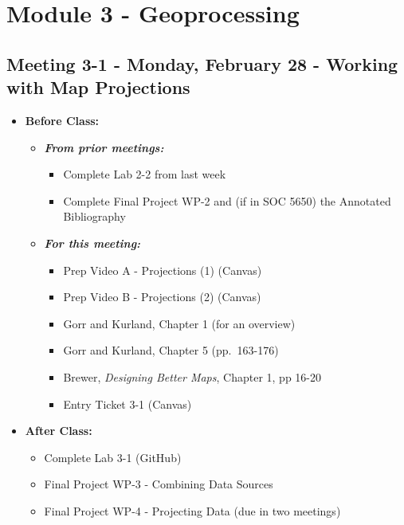 \documentclass[
]{book}
\providecommand{\tightlist}{%
  \setlength{\itemsep}{0pt}\setlength{\parskip}{0pt}}
\begin{document}
\hypertarget{module-3---geoprocessing}{%
\section*{Module 3 - Geoprocessing}\label{module-3---geoprocessing}}

\hypertarget{meeting-3-1---monday-february-28---working-with-map-projections}{%
\subsection*{Meeting 3-1 - Monday, February 28 - Working with Map Projections}\label{meeting-3-1---monday-february-28---working-with-map-projections}}

\begin{itemize}
\tightlist
\item
  \textbf{Before Class:}

  \begin{itemize}
  \tightlist
  \item
    \textbf{\emph{From prior meetings:}}

    \begin{itemize}
    \tightlist
    \item
      Complete Lab 2-2 from last week
    \item
      Complete Final Project WP-2 and (if in SOC 5650) the Annotated Bibliography
    \end{itemize}
  \item
    \textbf{\emph{For this meeting:}}

    \begin{itemize}
    \tightlist
    \item
      Prep Video A - Projections (1) (Canvas)
    \item
      Prep Video B - Projections (2) (Canvas)
    \item
      Gorr and Kurland, Chapter 1 (for an overview)
    \item
      Gorr and Kurland, Chapter 5 (pp.~163-176)
    \item
      Brewer, \emph{Designing Better Maps}, Chapter 1, pp 16-20
    \item
      Entry Ticket 3-1 (Canvas)
    \end{itemize}
  \end{itemize}
\item
  \textbf{After Class:}

  \begin{itemize}
  \tightlist
  \item
    Complete Lab 3-1 (GitHub)
  \item
    Final Project WP-3 - Combining Data Sources
  \item
    Final Project WP-4 - Projecting Data (due in two meetings)
  \end{itemize}
\end{itemize}
\end{document}
